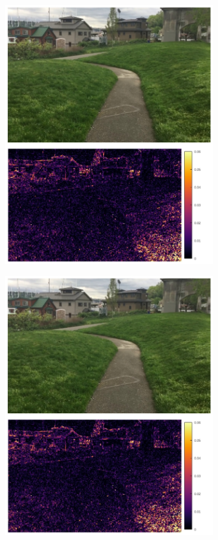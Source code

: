 \documentclass{article}
\begin{document}
\begin{figure}[h]
\begin{subfigure}{0.125\textwidth}
    \includegraphics[width=1\linewidth]{qua_imgs/720p_240fps_1_abme.jpg}
\end{subfigure}%
\begin{subfigure}{0.125\textwidth}
	\centering
    \includegraphics[width=1\linewidth]{qua_imgs/720p_240fps_1_film.jpg}

\end{subfigure}
\end{figure}
\end{document}

